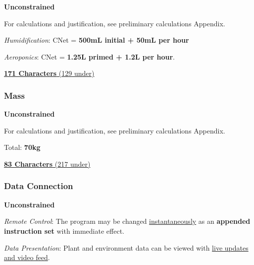 \documentclass{report}
\begin{document}
\textbf{Unconstrained}

For calculations and justification, see preliminary calculations Appendix.

\textit{Humidification}: CNet = \textbf{500mL initial + 50mL per hour}

\textit{Aeroponics}: CNet = \textbf{1.25L primed + 1.2L per hour}.

\uline{\textbf{171 Characters} (129 under)}

\vspace{0.5cm}

\subsubsection{Mass} 
\label{sec:constraints-mass}

\textbf{Unconstrained}

For calculations and justification, see preliminary calculations Appendix.

Total: \textbf{70kg}

\uline{\textbf{83 Characters} (217 under)}

\vspace{0.5cm}

\subsubsection{Data Connection} 
\label{sec:constraints-data}

\textbf{Unconstrained}

\textit{Remote Control}: The program may be changed \uline{instantaneously} as an \textbf{appended instruction set} with immediate effect.

\textit{Data Presentation}: Plant and environment data can be viewed with \uline{live updates and video feed}.
\end{document}
